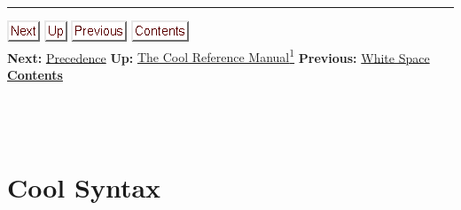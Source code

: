 \documentclass[]{article}
\begin{document}
\begin{center}\rule{3in}{0.4pt}\end{center}

\href{node40.html}{\includegraphics{next.png}}
\href{cool-manual.html}{\includegraphics{up.png}}
\href{node38.html}{\includegraphics{prev.png}}
\href{node1.html}{\includegraphics{contents.png}} \\ \textbf{Next:}
\href{node40.html}{Precedence} \textbf{Up:} \href{cool-manual.html}{The
Cool Reference Manual\textsuperscript{1}} \textbf{Previous:}
\href{node38.html}{White Space} ~ \textbf{\href{node1.html}{Contents}}
\\ \\

\section{\\ Cool Syntax}
\end{document}
